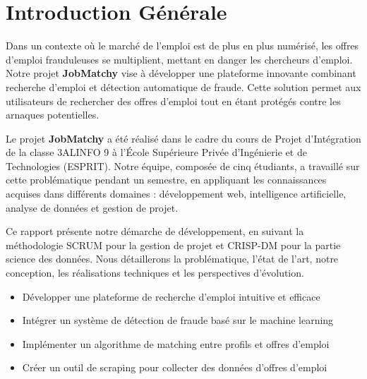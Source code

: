 \documentclass[10pt,a4paper,twocolumn]{article}
\begin{document}
\vspace{1cm}

\section{Introduction Générale}
\begin{tcolorbox}[title=Contexte du projet]
Dans un contexte où le marché de l'emploi est de plus en plus numérisé, les offres d'emploi frauduleuses se multiplient, mettant en danger les chercheurs d'emploi. Notre projet \textbf{JobMatchy} vise à développer une plateforme innovante combinant recherche d'emploi et détection automatique de fraude. Cette solution permet aux utilisateurs de rechercher des offres d'emploi tout en étant protégés contre les arnaques potentielles.
\end{tcolorbox}

\begin{spacing}{1.2}
Le projet \textbf{JobMatchy} a été réalisé dans le cadre du cours de Projet d'Intégration de la classe 3ALINFO 9 à l'École Supérieure Privée d'Ingénierie et de Technologies (ESPRIT). Notre équipe, composée de cinq étudiants, a travaillé sur cette problématique pendant un semestre, en appliquant les connaissances acquises dans différents domaines : développement web, intelligence artificielle, analyse de données et gestion de projet.

Ce rapport présente notre démarche de développement, en suivant la méthodologie SCRUM pour la gestion de projet et CRISP-DM pour la partie science des données. Nous détaillerons la problématique, l'état de l'art, notre conception, les réalisations techniques et les perspectives d'évolution.

\begin{tcolorbox}[title=Objectifs principaux du projet]
\begin{itemize}
    \item Développer une plateforme de recherche d'emploi intuitive et efficace
    \item Intégrer un système de détection de fraude basé sur le machine learning
    \item Implémenter un algorithme de matching entre profils et offres d'emploi
    \item Créer un outil de scraping pour collecter des données d'offres d'emploi
\end{itemize}
\end{tcolorbox}
\end{spacing}
\end{document}
